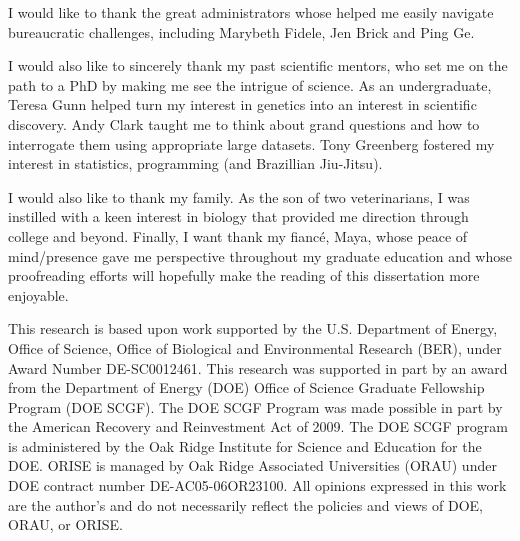 I would like to thank the great administrators whose helped me easily navigate bureaucratic challenges, including Marybeth Fidele, Jen Brick and Ping Ge.

I would also like to sincerely thank my past scientific mentors, who set me on the path to a PhD by making me see the intrigue of science. As an undergraduate, Teresa Gunn helped turn my interest in genetics into an interest in scientific discovery. Andy Clark taught me to think about grand questions and how to interrogate them using appropriate large datasets. Tony Greenberg fostered my interest in statistics, programming (and Brazillian Jiu-Jitsu).

I would also like to thank my family. As the son of two veterinarians,  I was instilled with a keen interest in biology that provided me direction through college and beyond. Finally, I want thank my fianc\'{e}, Maya, whose peace of mind/presence gave me perspective throughout my graduate education and whose proofreading efforts will hopefully make the reading of this dissertation more enjoyable.

This research is based upon work supported by the U.S. Department of Energy, Office of Science, Office of Biological and Environmental Research (BER), under Award Number DE-SC0012461. This research was supported in part by an award from the Department of Energy (DOE) Office of Science Graduate Fellowship Program (DOE SCGF). The DOE SCGF Program was made possible in part by the American Recovery and Reinvestment Act of 2009.  The DOE SCGF program is administered by the Oak Ridge Institute for Science and Education for the DOE. ORISE is managed by Oak Ridge Associated Universities (ORAU) under DOE contract number DE-AC05-06OR23100.  All opinions expressed in this work are the author's and do not necessarily reflect the policies and views of DOE, ORAU, or ORISE.
